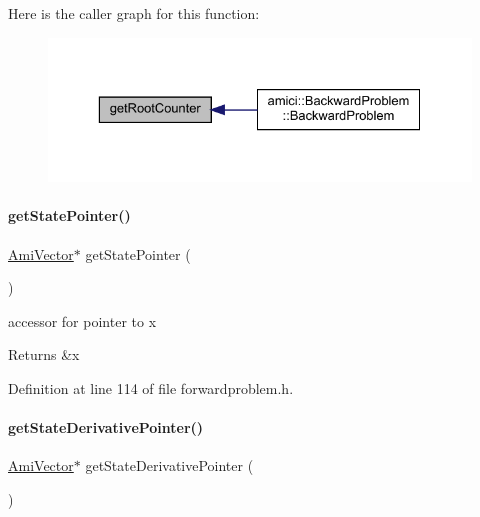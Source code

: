 Here is the caller graph for this function\+:
\nopagebreak
\begin{figure}[H]
\begin{center}
\leavevmode
\includegraphics[width=329pt]{classamici_1_1_forward_problem_a9ba8c1d4ef2ba23e6f4faaaefd28aae9_icgraph}
\end{center}
\end{figure}
\mbox{\label{classamici_1_1_forward_problem_a0efbb7c64b718e9b8b8020acd59afb78}} 
\paragraph{\texorpdfstring{get\+State\+Pointer()}{getStatePointer()}}
{\footnotesize\ttfamily \mbox{\hyperlink{classamici_1_1_ami_vector}{Ami\+Vector}}$\ast$ get\+State\+Pointer (\begin{DoxyParamCaption}{ }\end{DoxyParamCaption})}

accessor for pointer to x \begin{DoxyReturn}{Returns}
\&x 
\end{DoxyReturn}


Definition at line 114 of file forwardproblem.\+h.

\mbox{\label{classamici_1_1_forward_problem_a096d23f8405c903ca5d5d4efec5facc0}} 
\paragraph{\texorpdfstring{get\+State\+Derivative\+Pointer()}{getStateDerivativePointer()}}
{\footnotesize\ttfamily \mbox{\hyperlink{classamici_1_1_ami_vector}{Ami\+Vector}}$\ast$ get\+State\+Derivative\+Pointer (\begin{DoxyParamCaption}{ }\end{DoxyParamCaption})}

